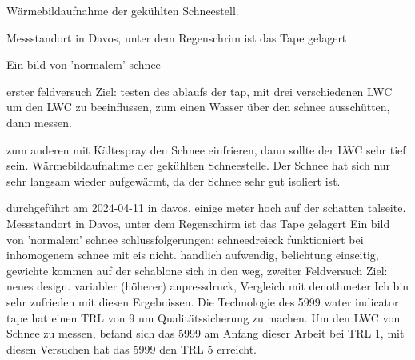 \label{ErstFeldVer}
\caption{Wärmebildaufnahme der gekühlten Schneestell. }


\caption{Messstandort in Davos, unter dem Regenschrim ist das Tape gelagert} 

\caption{Ein bild von 'normalem' schnee}


\label{ZweiFeldVer}


erster feldversuch Ziel: testen des ablaufs der tap, mit drei verschiedenen LWC um den LWC zu beeinflussen, zum einen Wasser über den schnee ausschütten,
dann messen.

zum anderen mit Kältespray den Schnee einfrieren, dann sollte der LWC sehr tief sein. Wärmebildaufnahme der gekühlten Schneestelle.
Der Schnee hat sich nur sehr langsam wieder aufgewärmt, da der Schnee sehr gut isoliert ist.

durchgeführt am 2024-04-11 in davos, einige meter hoch auf der schatten talseite. Messstandort in Davos, unter dem Regenschirm ist das Tape gelagert Ein bild von ’normalem’ schnee schlussfolgerungen: schneedreieck funktioniert bei inhomogenem schnee mit eis nicht. handlich aufwendig, belichtung einseitig, gewichte kommen auf der schablone sich in den weg, zweiter Feldversuch Ziel: neues design. variabler (höherer) anpressdruck, Vergleich mit denothmeter Ich bin sehr zufrieden mit diesen Ergebnissen. Die Technologie des 5999 water indicator tape hat einen TRL von 9 um Qualitätssicherung zu machen. Um den LWC von Schnee zu messen, befand sich das 5999 am Anfang dieser Arbeit bei TRL 1, mit diesen Versuchen hat das 5999 den TRL 5 erreicht.

